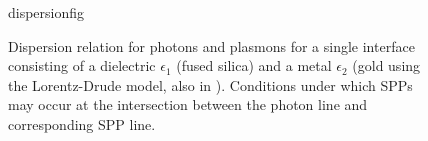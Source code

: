 \begin{figure}[ht]
 \centering
{dispersionfig}
\label{fig:dispersionrelation}
\caption{ Dispersion relation for photons and plasmons for a single
interface consisting of a dielectric $\epsilon_1$ (fused silica) and a
metal $\epsilon_2$ (gold using the Lorentz-Drude model, also in
). Conditions under which SPPs may occur at the
intersection between the photon line and corresponding SPP line.  }
\end{figure}

